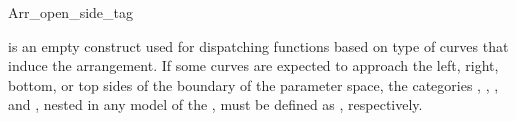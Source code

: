 
\ccRefPageBegin

\begin{ccRefClass}{Arr_open_side_tag}

\ccDefinition

\ccRefName{} is an empty construct used for dispatching functions based on
type of curves that induce the arrangement. If some curves are expected to
approach the left, right, bottom, or top sides of the boundary of the
parameter space, the categories ,
, , and
, nested in any model of the
, must be defined as \ccRefName{}, respectively.


\ccSeeAlso
    \\

\end{ccRefClass}

\ccRefPageEnd
